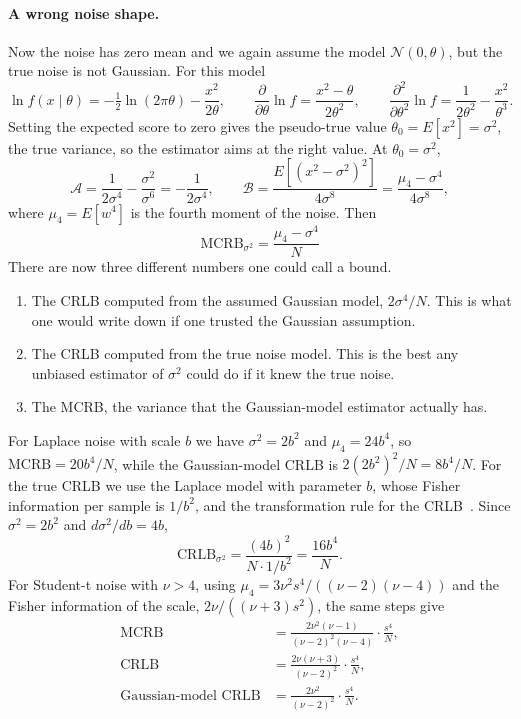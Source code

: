 \documentclass[11pt]{article}
\numberwithin{figure}{section}
\numberwithin{equation}{section}
\begin{document}
\paragraph{A wrong noise shape.} Now the noise has zero mean and we again assume the model
$\mathcal{N}(0, \theta)$, but the true noise is not Gaussian. For this model
\[
  \ln f(x\mid\theta) = -\tfrac12\ln(2\pi\theta) - \frac{x^2}{2\theta}, \qquad
  \frac{\partial}{\partial\theta}\ln f = \frac{x^2 - \theta}{2\theta^2}, \qquad
  \frac{\partial^2}{\partial\theta^2}\ln f = \frac{1}{2\theta^2} - \frac{x^2}{\theta^3}.
\]
Setting the expected score to zero gives the pseudo-true value $\theta_0 = E[x^2] = \sigma^2$, the true
variance, so the estimator aims at the right value. At $\theta_0 = \sigma^2$,
\[
  \mathcal{A} = \frac{1}{2\sigma^4} - \frac{\sigma^2}{\sigma^6} = -\frac{1}{2\sigma^4}, \qquad
  \mathcal{B} = \frac{E[(x^2 - \sigma^2)^2]}{4\sigma^8} = \frac{\mu_4 - \sigma^4}{4\sigma^8},
\]
where $\mu_4 = E[w^4]$ is the fourth moment of the noise. Then
\[
  \boxed{\text{MCRB}_{\sigma^2} = \frac{\mu_4 - \sigma^4}{N}}
\]
There are now three different numbers one could call a bound.
\begin{enumerate}
  \item The CRLB computed from the assumed Gaussian model, $2\sigma^4/N$. This is what one would
        write down if one trusted the Gaussian assumption.
  \item The CRLB computed from the true noise model. This is the best any unbiased estimator of
        $\sigma^2$ could do if it knew the true noise.
  \item The MCRB, the variance that the Gaussian-model estimator actually has.
\end{enumerate}
For Laplace noise with scale $b$ we have $\sigma^2 = 2b^2$ and $\mu_4 = 24b^4$, so
$\text{MCRB} = 20b^4/N$, while the Gaussian-model CRLB is $2(2b^2)^2/N = 8b^4/N$. For the true CRLB we
use the Laplace model with parameter $b$, whose Fisher information per sample is $1/b^2$, and the
transformation rule for the CRLB~\cite{kay}. Since $\sigma^2 = 2b^2$ and $d\sigma^2/db = 4b$,
\[
  \text{CRLB}_{\sigma^2} = \frac{(4b)^2}{N\cdot 1/b^2} = \frac{16 b^4}{N}.
\]
For Student-t noise with $\nu > 4$, using $\mu_4 = 3\nu^2 s^4/((\nu-2)(\nu-4))$ and the Fisher
information of the scale, $2\nu/((\nu+3)s^2)$, the same steps give
\begin{align*}
  \text{MCRB} &= \frac{2\nu^2(\nu-1)}{(\nu-2)^2(\nu-4)}\cdot\frac{s^4}{N}, \\
  \text{CRLB} &= \frac{2\nu(\nu+3)}{(\nu-2)^2}\cdot\frac{s^4}{N}, \\
  \text{Gaussian-model CRLB} &= \frac{2\nu^2}{(\nu-2)^2}\cdot\frac{s^4}{N}.
\end{align*}
\end{document}
